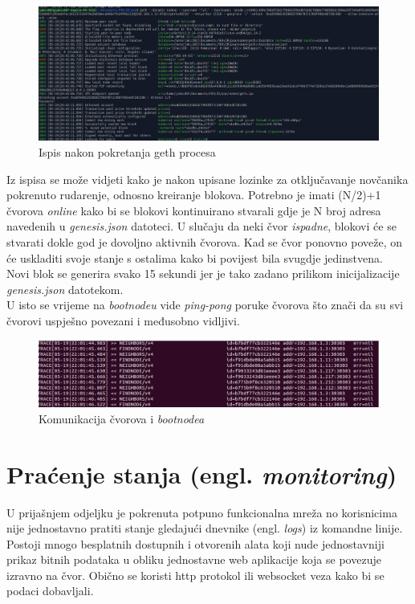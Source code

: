\documentclass[times, utf8, zavrsni, numeric]{fer}
\begin{document}
\begin{figure}[ht]
  \includegraphics[width=\textwidth]{nodeStart.png}
  \caption{Ispis nakon pokretanja geth procesa}
  \centering
\end{figure}

Iz ispisa se može vidjeti kako je nakon upisane lozinke za otključavanje novčanika pokrenuto rudarenje, odnosno kreiranje blokova.
Potrebno je imati (N/2)+1 čvorova \emph{online} kako bi se blokovi
kontinuirano stvarali gdje je N broj adresa navedenih u \emph{genesis.json} datoteci. U slučaju da neki čvor \emph{ispadne},
blokovi će se stvarati dokle god je dovoljno aktivnih čvorova. Kad se čvor ponovno poveže, on će uskladiti svoje stanje
s ostalima kako bi povijest bila svugdje jedinstvena. \\
Novi blok se generira svako 15 sekundi jer je tako zadano prilikom inicijalizacije \emph{genesis.json} datotekom. \\
U isto se vrijeme na \emph{bootnodeu} vide \emph{ping-pong} poruke čvorova što znači da su svi čvorovi uspješno povezani i međusobno
vidljivi.

\begin{figure}[ht]
  \includegraphics[width=\textwidth]{bootnode.png}
  \caption{Komunikacija čvorova i \emph{bootnodea}}
  \centering
\end{figure}

\pagebreak
\section{Praćenje stanja (engl. \emph{monitoring})}
U prijašnjem odjeljku je pokrenuta potpuno funkcionalna mreža no korisnicima nije jednostavno pratiti stanje gledajući
dnevnike (engl. \emph{logs}) iz komandne linije. Postoji mnogo besplatnih dostupnih i otvorenih alata koji nude jednostavniji
prikaz bitnih podataka u obliku jednostavne web aplikacije koja se povezuje izravno na čvor. Obično se koristi http protokol
ili websocket veza kako bi se podaci dobavljali.
\end{document}
